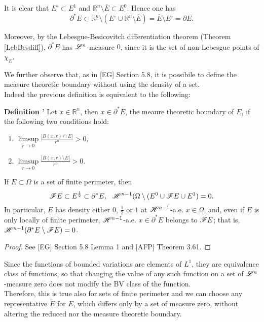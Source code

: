 \begin{remark} \label{essboundnull} It is clear that $E^{\circ} \subset E^{1}$ and $\mathbb{R}^{n} \setminus \overline E \subset E^{0}$. Hence one has 
\[ \partial^{*} E \subset \mathbb{R}^{n} \setminus (E^{\circ} \cup \mathbb{R}^{n} \setminus \overline E) = \overline E \setminus E^{\circ} = \partial E. \]

Moreover, by the Lebesgue-Besicovitch differentiation theorem (Theorem \ref{LebBesdiff}), $\partial^{*} E$ has $\mathscr{L}^{n}$-measure $0$, since it is the set of non-Lebesgue points of $\chi_{E}$.

We further observe that, as in [EG] Section 5.8, it is possibile to define the measure theoretic boundary without using the density of a set.
\\
Indeed the previous definition is equivalent to the following:

\textbf{Definition \label{measuretheorintext}'} Let $x \in \mathbb{R}^{n}$, then $x \in \partial^{*}E$, the meaure theoretic boundary of $E$, if the following two conditions hold:
\begin{enumerate}
	\item $\displaystyle \limsup\limits_{r \to 0} \frac{|B(x,r) \cap E|}{r^{n}} > 0,$
	\item $\displaystyle \limsup\limits_{r \to 0} \frac{|B(x,r) \setminus E|}{r^{n}} > 0.$
\end{enumerate}
\end{remark}

\begin{theorem} \label{structhm2} If $E \subset \Omega$ is a set of finite perimeter, then
\[ \mathscr{F} E \subset E^{\frac{1}{2}} \subset \partial^{*}E, \  \ \mathscr{H}^{n-1}(\Omega \setminus (E^{0} \cup \mathscr{F} E \cup E^{1}) = 0. \]
In particular, $E$ has density either $0$, $\frac{1}{2}$ or $1$ at $\mathscr{H}^{n-1}$-a.e. $x \in \Omega$, and, even if $E$ is only locally of finite perimeter, $\mathscr{H}^{n-1}$-a.e. $x \in \partial^{*}E$ belongs to $\mathscr{F} E$; that is, $\mathscr{H}^{n-1}(\partial^{*}E \setminus \mathscr{F} E) = 0$.
\end{theorem}
\begin{proof} See [EG] Section 5.8 Lemma 1 and [AFP] Theorem 3.61.
\end{proof}

\begin{remark} \label{setrepr} Since the functions of bounded variations are elements of $L^{1}$, they are equivalence class of functions, so that changing the value of any such function on a set of $\mathscr{L}^{n}$-measure zero does not modify the BV class of the function.
\\
Therefore, this is true also for sets of finite perimeter and we can choose any representative $\widetilde{E}$ for $E$, which differs only by a set of measure zero, without altering the reduced nor the measure theoretic boundary.
\end{remark}

